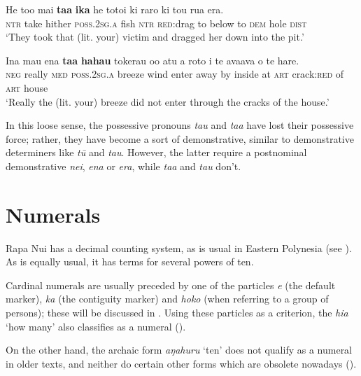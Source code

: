 \ea\label{ex:4.9}
\gll He to{\ꞌ}o mai \textbf{ta{\ꞌ}a} \textbf{ika} he totoi ki raro ki tou rua era. \\
\textsc{ntr} take hither \textsc{poss.2sg.a} fish \textsc{ntr} \textsc{red}:drag to below to \textsc{dem} hole \textsc{dist} \\

\glt 
‘They took that (lit. your) victim and dragged her down into the pit.’ \textstyleExampleref{[R368.099]} 
\z

\ea\label{ex:4.10}
\gll {\ꞌ}Ina mau ena \textbf{ta{\ꞌ}a} \textbf{hahau} tokerau o{\ꞌ}o atu a roto i te avaava  o te hare.\\
\textsc{neg} really \textsc{med} \textsc{poss.2sg.a} breeze wind enter away by inside at \textsc{art} crack:\textsc{red}  of \textsc{art} house\\

\glt
‘Really the (lit. your) breeze did not enter through the cracks of the house.’ \textstyleExampleref{[R347.055]} 
\z

In this loose sense, the possessive pronouns \textit{ta{\ꞌ}u} and \textit{ta{\ꞌ}a} have lost their possessive force; rather, they have become a sort of demonstrative, similar to demonstrative determiners like \textit{tū} and \textit{tau}. However, the latter require a postnominal demonstrative \textit{nei}, \textit{ena} or \textit{era}, while \textit{ta{\ꞌ}a} and \textit{ta{\ꞌ}u} don’t.

\section{Numerals}\label{sec:4.3}
Rapa Nui has a decimal counting system, as is usual in Eastern Polynesia (see \citealt{Lemaître1985}). As is equally usual, it has terms for several powers of ten.

Cardinal numerals are usually preceded by one of the particles \textit{e} (the default marker), \textit{ka} (the contiguity marker) and \textit{hoko} (when referring to a group of persons); these will be discussed in . Using these particles as a criterion, the  \textit{hia} ‘how many’ also classifies as a numeral ().

On the other hand, the archaic form \textit{{\ꞌ}aŋahuru} ‘ten’ does not qualify as a numeral in older texts, and neither do certain other forms which are obsolete nowadays ().


